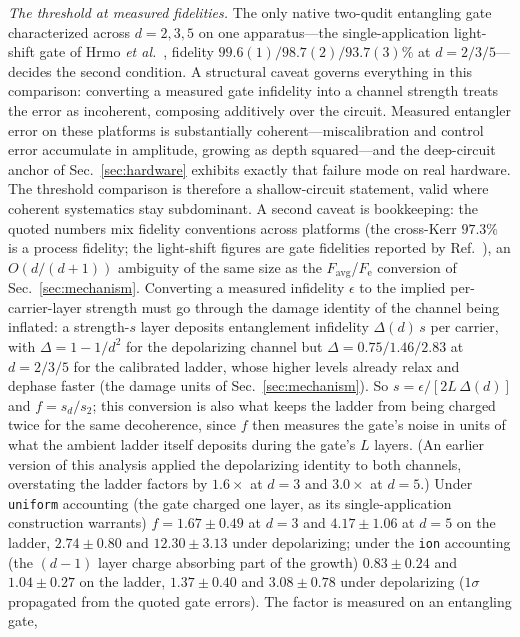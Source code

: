 \documentclass[aps,pra,reprint,superscriptaddress,nofootinbib,floatfix]{revtex4-2}
\newcommand{\Fe}{F_{\mathrm{e}}}
\begin{document}
\emph{The threshold at measured fidelities.} The only native
two-qudit entangling gate characterized across $d=2,3,5$ on one
apparatus---the single-application light-shift gate
of Hrmo \emph{et al.}~\cite{hrmo2023}, fidelity $99.6(1)/98.7(2)/
93.7(3)\%$ at $d=2/3/5$---decides the second condition. A structural
caveat governs everything in this comparison: converting a measured
gate infidelity into a channel strength treats the error as
incoherent, composing additively over the circuit. Measured
entangler error on these platforms is substantially
coherent---miscalibration and control error accumulate in amplitude,
growing as depth squared---and the deep-circuit anchor of
Sec.~\ref{sec:hardware} exhibits exactly that failure mode on real
hardware. The threshold comparison is therefore a
shallow-circuit statement, valid where coherent systematics stay
subdominant. A second caveat is bookkeeping: the quoted numbers mix
fidelity conventions across platforms (the cross-Kerr $97.3\%$ is a
process fidelity; the light-shift figures are gate fidelities
reported by Ref.~\cite{hrmo2023}), an $O(d/(d{+}1))$ ambiguity of the
same size as the $F_{\mathrm{avg}}$/$\Fe$ conversion of
Sec.~\ref{sec:mechanism}. Converting
a measured infidelity $\epsilon$ to the implied per-carrier-layer
strength must go through the damage identity of the channel being
inflated: a strength-$s$ layer deposits entanglement infidelity
$\Delta(d)\,s$ per carrier, with $\Delta=1-1/d^2$ for the
depolarizing channel but $\Delta=0.75/1.46/2.83$ at $d=2/3/5$ for
the calibrated ladder, whose higher levels already relax and
dephase faster (the damage units of Sec.~\ref{sec:mechanism}). So
$s=\epsilon/[2L\,\Delta(d)]$ and $f=s_d/s_2$; this conversion is
also what keeps the ladder from being charged twice for the same
decoherence, since $f$ then measures the gate's noise in units of
what the ambient ladder itself deposits during the gate's $L$
layers. (An earlier version of this analysis applied the
depolarizing identity to both channels, overstating the ladder
factors by $1.6\times$ at $d{=}3$ and $3.0\times$ at $d{=}5$.)
Under \texttt{uniform} accounting (the gate charged one layer, as
its single-application construction warrants) $f=1.67\pm0.49$ at
$d=3$ and $4.17\pm1.06$ at $d=5$ on the ladder, $2.74\pm0.80$ and
$12.30\pm3.13$ under depolarizing; under the \texttt{ion}
accounting (the $(d{-}1)$ layer charge absorbing part of the
growth) $0.83\pm0.24$ and $1.04\pm0.27$ on the ladder,
$1.37\pm0.40$ and $3.08\pm0.78$ under depolarizing ($1\sigma$
propagated from the quoted gate errors). The factor is measured on an entangling gate,
\end{document}
